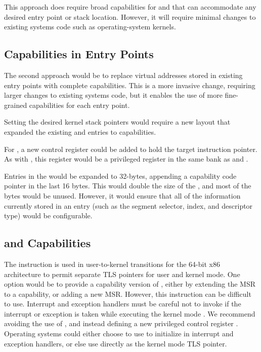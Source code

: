 This approach does require broad capabilities
for \KCC{} and \KSC{} that can accommodate any desired entry point or stack
location.  However, it will require minimal changes to existing systems
code such as operating-system kernels.

\subsection{Capabilities in Entry Points}

The second approach would be to replace virtual addresses stored in
existing entry points with complete capabilities.  This is a more
invasive change, requiring larger changes to existing systems code, but
it enables the use of more fine-grained capabilities for each entry
point.

Setting the desired kernel stack pointers \CSP{} would require a new
\TSS{} layout that expanded the existing \RSP{} and \IST{} entries to
capabilities.

For , a new control register \CSTAR{} could be
added to hold the target instruction pointer.  As with \KCC{},
this register would be a privileged register in the same bank as
\CFS{} and \CGS{}.

Entries in the \IDT{} would be expanded to 32-bytes, appending a capability
code pointer in the last 16 bytes.  This would double the size of the
\IDT{}, and most of the bytes would be unused.  However, it would
ensure that all of the information currently stored in an \IDT{} entry
(such as the segment selector, \IST{} index, and descriptor type) would
be configurable.

\subsection{ and Capabilities}

The  instruction is used in user-to-kernel
transitions for the 64-bit x86 architecture to permit separate TLS
pointers for user and kernel mode.  One option would be to provide a
capability version of , either by extending the
\KGSBASE{} MSR to a capability, or adding a new MSR.  However, this
instruction can be difficult to use.  Interrupt and exception handlers
must be careful not to invoke  if the interrupt
or exception is taken while executing the kernel mode \GS{}.  We
recommend avoiding the use of , and instead defining
a new privileged control register \KGS{}.  Operating systems could
either choose to use \KGS{} to initialize \CGS{} in interrupt and
exception handlers, or else use \KGS{} directly as the kernel mode TLS
pointer.

